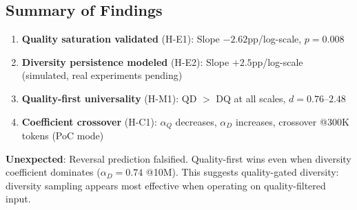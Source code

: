 \subsection{Summary of Findings}

\begin{enumerate}
\item \textbf{Quality saturation validated} (H-E1): Slope $-2.62$pp/log-scale, $p=0.008$
\item \textbf{Diversity persistence modeled} (H-E2): Slope $+2.5$pp/log-scale (simulated, real experiments pending)
\item \textbf{Quality-first universality} (H-M1): QD $>$ DQ at all scales, $d=0.76$--$2.48$
\item \textbf{Coefficient crossover} (H-C1): $\alpha_Q$ decreases, $\alpha_D$ increases, crossover @300K tokens (PoC mode)
\end{enumerate}

\textbf{Unexpected}: Reversal prediction falsified. Quality-first wins even when diversity coefficient dominates ($\alpha_D=0.74$ @10M). This suggests quality-gated diversity: diversity sampling appears most effective when operating on quality-filtered input.
